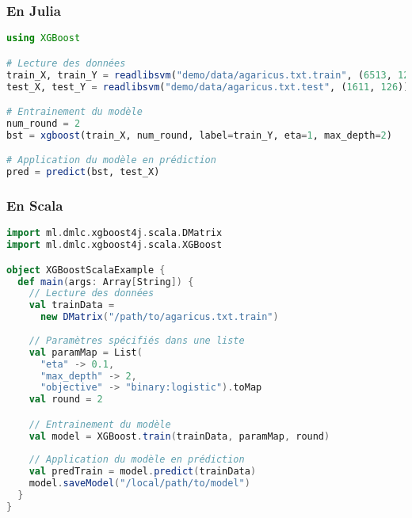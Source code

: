 \subsubsection{En Julia}

\begin{lstlisting}[language=julia]
using XGBoost

# Lecture des données
train_X, train_Y = readlibsvm("demo/data/agaricus.txt.train", (6513, 126))
test_X, test_Y = readlibsvm("demo/data/agaricus.txt.test", (1611, 126))

# Entrainement du modèle
num_round = 2
bst = xgboost(train_X, num_round, label=train_Y, eta=1, max_depth=2)

# Application du modèle en prédiction
pred = predict(bst, test_X)
\end{lstlisting}

\subsubsection{En Scala}

\begin{lstlisting}[language=Scala]
import ml.dmlc.xgboost4j.scala.DMatrix
import ml.dmlc.xgboost4j.scala.XGBoost

object XGBoostScalaExample {
  def main(args: Array[String]) {
    // Lecture des données
    val trainData =
      new DMatrix("/path/to/agaricus.txt.train")
    
    // Paramètres spécifiés dans une liste
    val paramMap = List(
      "eta" -> 0.1,
      "max_depth" -> 2,
      "objective" -> "binary:logistic").toMap
    val round = 2

    // Entrainement du modèle
    val model = XGBoost.train(trainData, paramMap, round)
    
    // Application du modèle en prédiction
    val predTrain = model.predict(trainData)
    model.saveModel("/local/path/to/model")
  }
}
\end{lstlisting}